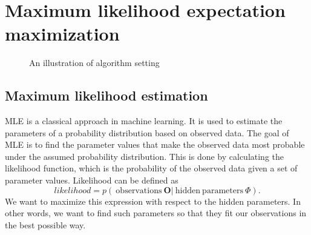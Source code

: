 \section{Maximum likelihood expectation maximization}

\begin{figure}[!h]
  \centering

  \caption{An illustration of algorithm setting}
\end{figure}


\cite{1982_shepp_vardi_MLEM} \cite{EM} \cite{wilderman}

\subsection{Maximum likelihood estimation}
\ac{MLE} is a classical approach in machine learning.
It is used to estimate the parameters of a probability distribution based on observed data. 
The goal of \ac{MLE} is to find the parameter values that make the observed data most probable under the assumed probability distribution.
This is done by calculating the likelihood function, which is the probability of the observed data given a set of parameter values.
Likelihood can be defined as 
\begin{equation}
  likelihood = p(\ \mathrm{observations } \  \boldsymbol{O} | \ \mathrm{hidden \ parameters\ } \Phi ).
  \label{eq:likelihood}
\end{equation}
We want to maximize this expression with respect to the hidden parameters.
In other words, we want to find such parameters so that they fit our observations in the best possible way.

